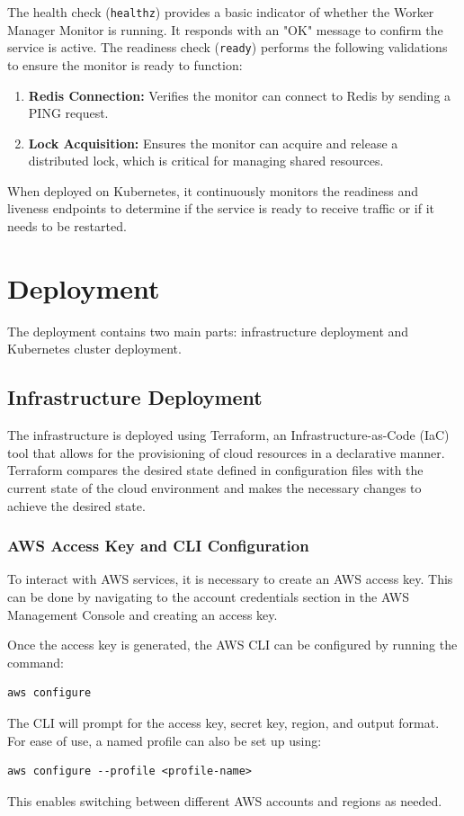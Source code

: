 The health check (\texttt{healthz}) provides a basic indicator of whether the Worker Manager Monitor is running. It responds with an "OK" message to confirm the service is active.
The readiness check (\texttt{ready}) performs the following validations to ensure the monitor is ready to function:
\begin{enumerate}
    \item \textbf{Redis Connection:} Verifies the monitor can connect to Redis by sending a PING request.
    \item \textbf{Lock Acquisition:} Ensures the monitor can acquire and release a distributed lock, which is critical for managing shared resources.
\end{enumerate}

When deployed on Kubernetes, it continuously monitors the readiness and liveness endpoints to determine if the service is ready to receive traffic or if it needs to be restarted.

\section{Deployment}
The deployment contains two main parts: infrastructure deployment and Kubernetes cluster deployment.
\subsection{Infrastructure Deployment}
The infrastructure is deployed using Terraform, an Infrastructure-as-Code (IaC) tool that allows for the provisioning of cloud resources in a declarative manner. Terraform compares the desired state defined in configuration files with the current state of the cloud environment and makes the necessary changes to achieve the desired state.

\subsubsection{AWS Access Key and CLI Configuration}
To interact with AWS services, it is necessary to create an AWS access key. This can be done by navigating to the account credentials section in the AWS Management Console and creating an access key.

Once the access key is generated, the AWS CLI can be configured by running the command:
\begin{verbatim}
aws configure
\end{verbatim}
The CLI will prompt for the access key, secret key, region, and output format. For ease of use, a named profile can also be set up using:
\begin{verbatim}
aws configure --profile <profile-name>
\end{verbatim}
This enables switching between different AWS accounts and regions as needed.

